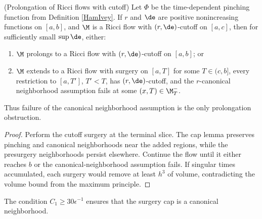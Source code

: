 \begin{lemma}
  \label{lem:kl-performing-surgery-continuing-flows-existence-canonical-neighborhoods}
(Prolongation of Ricci flows with cutoff)
\label{extendit}
Let $\Phi$ be the time-dependent pinching function from Definition
\ref{HamIvey}. If $r$ and $\de$ are positive nonincreasing functions on
$[a,b]$, and $\M$ is a Ricci flow with $(r,\de)$-cutoff on $[a,c]$, then for
sufficiently small $\sup\de$, either:
\begin{enumerate}
\item $\M$ prolongs to a Ricci flow with $(r,\de)$-cutoff on $[a,b]$; or
\item $\M$ extends to a Ricci flow with surgery on $[a,T]$ for some
$T\in(c,b]$, every restriction to $[a,T']$, $T'<T$, has $(r,\de)$-cutoff,
and the $r$-canonical neighborhood assumption fails at some
$(x,T)\in\M_T^-$.
\end{enumerate}
Thus failure of the canonical neighborhood assumption is the only
prolongation obstruction.
\end{lemma}
\begin{proof}
\sketch Perform the cutoff surgery at the terminal slice. The cap lemma
preserves pinching and canonical neighborhoods near the added regions, while
the presurgery neighborhoods persist elsewhere. Continue the flow until it
either reaches $b$ or the canonical-neighborhood assumption fails. If
singular times accumulated, each surgery would remove at least $h^3$ of
volume, contradicting the volume bound from the maximum principle.
\end{proof}

\begin{remark}
  \label{rem:kl-performing-surgery-continuing-flows-structural-remark-canonical-neighborhoods}
 \label{30}
The condition $C_1\geq30\epsilon^{-1}$ ensures that the surgery cap is a
canonical neighborhood.
\end{remark}


